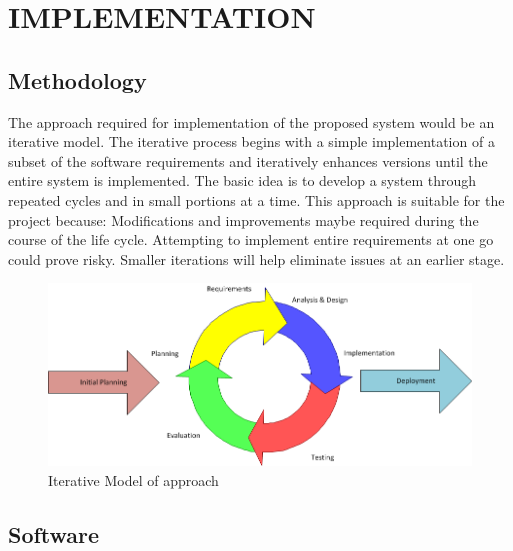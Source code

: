 

\chapter{IMPLEMENTATION}

\section{Methodology}

\hspace{0.9cm}The approach required for implementation of the proposed system would be an iterative model. The iterative process begins with a simple implementation of a subset of the software requirements and iteratively enhances versions until the entire system is implemented. The basic idea is to develop a system through repeated cycles and in small portions at a time.
This approach is suitable for the project because:
Modifications and improvements maybe required during the course of the life cycle.
Attempting to implement entire requirements at one go could prove risky. Smaller iterations will help eliminate issues at an earlier stage.
\begin{figure}[h!]
	\centering	
	\includegraphics[width=5.5in]{iterative1.png} %
	\caption{Iterative Model of approach}
	\label{fig:1} %
	
\end{figure} 

\section{Software}

